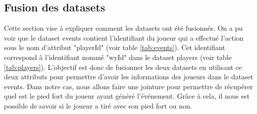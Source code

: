 \documentclass[12pt]{article}
\begin{document}
\subsection{Fusion des datasets}
Cette section vise à expliquer comment les datasets ont été fusionnés.
On a pu voir que le dataset events contient l'identifiant du joueur qui a effectué l'action sous le nom d'attribut "playerId" (voir table \ref{tab:events}).
Cet identifiant correspond à l'identifiant nommé "wyId" dans le dataset players (voir table \ref{tab:players}).
L'objectif est donc de fusionner les deux datasets en utilisant ce deux attributs pour permettre d'avoir les informations des joueurs dans le dataset events.
Dans notre cas, nous allons faire une jointure pour permettre de récupérer quel est le pied fort du joueur ayant généré l'événement.
Grâce à cela, il nous est possible de savoir si le joueur a tiré avec son pied fort ou non.
\newline\newline
\end{document}
